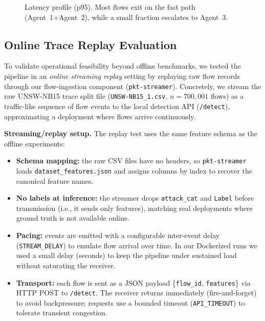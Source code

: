 \documentclass[conference]{IEEEtran}
\begin{document}
\begin{figure}[t]
\centering
{}
\caption{Latency profile (p95). Most flows exit on the fast path (Agent~1+Agent~2), while a small fraction escalates to Agent~3.}
\label{fig:latency}
\end{figure}

\subsection{Online Trace Replay Evaluation}
\label{sec:real_traffic}

To validate operational feasibility beyond offline benchmarks, we tested the pipeline in an \emph{online streaming replay} setting by replaying raw flow records through our flow-ingestion component (\texttt{pkt-streamer}). Concretely, we stream the raw UNSW-NB15 trace split file (\texttt{UNSW-NB15\_1.csv}, $n=700{,}001$ flows) as a traffic-like sequence of flow events to the local detection API (\texttt{/detect}), approximating a deployment where flows arrive continuously.

\textbf{Streaming/replay setup.} The replay test uses the same feature schema as the offline experiments:
\begin{itemize}
  \item \textbf{Schema mapping:} the raw CSV files have no headers, so \texttt{pkt-streamer} loads \texttt{dataset\_features.json} and assigns columns by index to recover the canonical feature names.
  \item \textbf{No labels at inference:} the streamer drops \texttt{attack\_cat} and \texttt{Label} before transmission (i.e., it sends only features), matching real deployments where ground truth is not available online.
  \item \textbf{Pacing:} events are emitted with a configurable inter-event delay (\texttt{STREAM\_DELAY}) to emulate flow arrival over time. In our Dockerized runs we used a small delay (seconds) to keep the pipeline under sustained load without saturating the receiver.
  \item \textbf{Transport:} each flow is sent as a JSON payload \{\texttt{flow\_id}, \texttt{features}\} via HTTP POST to \texttt{/detect}. The receiver returns immediately (fire-and-forget) to avoid backpressure; requests use a bounded timeout (\texttt{API\_TIMEOUT}) to tolerate transient congestion.
\end{itemize}
\end{document}

